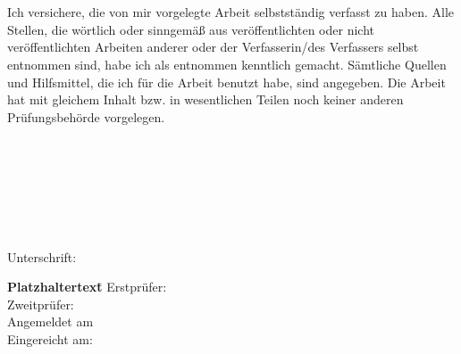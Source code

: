 \chapter*{}
\vspace*{-4cm}
Ich versichere, die von mir vorgelegte Arbeit selbstständig verfasst zu haben. Alle Stellen, die wörtlich oder sinngemäß aus veröffentlichten oder nicht veröffentlichten Arbeiten anderer oder der Verfasserin/des Verfassers selbst entnommen sind, habe ich als entnommen kenntlich gemacht. Sämtliche Quellen und Hilfsmittel, die ich für die Arbeit benutzt habe, sind angegeben. Die Arbeit hat mit gleichem Inhalt bzw. in wesentlichen Teilen noch keiner anderen Prüfungsbehörde vorgelegen.
\\\\
\\\\
\workAutor
\\\\
\\\\
\workStadtDatum \hfill{} Unterschrift: \hrulefill

\vfill
\begin{tabbing}
\textbf{Platzhaltertext}\qquad \= \kill
    \textsf{Erstprüfer:} \> 	\textsf{\workReferent}\\[0.2cm]
    \textsf{Zweitprüfer:} \> \textsf{\workKorreferent}\\[0.2cm]
    \textsf{Angemeldet am} \> \textsf{\workAusgabe}\\[0.2cm]
\textsf{Eingereicht am:} \> \textsf{\workAbgabe}\\[0.2cm]
\end{tabbing}